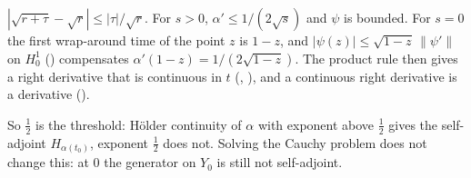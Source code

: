 \documentclass[11pt]{article}
\begin{document}
\begin{itemize}
\begin{itemize}
    $|\sqrt{r+\tau} - \sqrt r| \le |\tau|/\sqrt r$. For $s > 0$, $\alpha' \le 1/(2\sqrt s)$ and
    $\psi$ is bounded. For $s = 0$ the first wrap-around time of the point $z$ is $1 - z$, and
    $|\psi(z)| \le \sqrt{1-z}\,\|\psi'\|$ on $H^1_0$ () compensates
    $\alpha'(1-z) = 1/(2\sqrt{1-z})$. The product rule then gives a right derivative that is
    continuous in $t$ (,
    ), and a continuous right derivative is a derivative
    ().
  \end{itemize}
  So $\tfrac12$ is the threshold: Hölder continuity of $\alpha$ with exponent above $\tfrac12$
  gives the self-adjoint $H_{\alpha(t_0)}$, exponent $\tfrac12$ does not. Solving the Cauchy
  problem does not change this: at $0$ the generator on $Y_0$ is still not self-adjoint.
\end{itemize}
\end{document}
